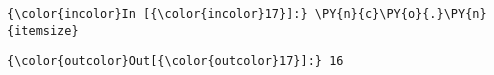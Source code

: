     \begin{Verbatim}[commandchars=\\\{\},frame=single,framerule=0.3mm,rulecolor=\color{cellframecolor}]
{\color{incolor}In [{\color{incolor}17}]:} \PY{n}{c}\PY{o}{.}\PY{n}{itemsize}
\end{Verbatim}


\begin{Verbatim}[commandchars=\\\{\},frame=single,framerule=0.3mm,rulecolor=\color{cellframecolor}]
{\color{outcolor}Out[{\color{outcolor}17}]:} 16
\end{Verbatim}
            

    
    
    
